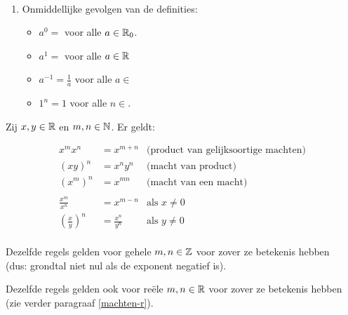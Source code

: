 \documentclass{ximera}
\begin{document}
\begin{remark} \ 
	
	\begin{enumerate}
	\item Onmiddellijke gevolgen van de definities:
			\begin{itemize}
			\item $a^0=$ voor alle $a\in\mathbb{R}_0$.
			\item $a^1=$ voor alle $a\in\mathbb{R}$
			\item $a^{-1}=\frac{1}{a}$ voor alle $a\in$\wordChoice{\choice{$\R$}\choice{$\Rplus$}\choice[correct]{$\Rnul$}}
			\item $1^n=1$ voor alle $n\in$\wordChoice{\choice{$\N$}\choice{$\R$}\choice[correct]{$\Z$}}.
		\end{itemize}
\end{enumerate} 
\end{remark}

\begin{proposition}
	Zij $x,y\in\mathbb{R}$ en $m,n\in\mathbb{N}$. Er geldt:
{
	\savebox\strutbox{$\vphantom{\dfrac11^n}$}   %
\begin{align*}
	x^{m}x^{n}  & = x^{m+n}            & \text{(product van gelijksoortige machten)} \\
	(xy)^n      & = x^ny^n             & \text{(macht van product)}\\
	\left(x^{m}\right)^{n} & = x^{mn}  & \text{(macht van een macht)} \\
	\\
	\frac{x^{m}}{x^{n}}    & = x^{m-n} & \text{als }x\neq0\\
	\left(\frac{x}{y}\right)^{n} & = \frac{x^{n}}{y^{n}} & \text{als }y\neq0\\
\end{align*}

	Dezelfde regels gelden voor gehele $m,n\in\mathbb{Z}$ voor zover ze betekenis hebben 
	\\ (dus: grondtal niet nul als de exponent negatief is).
	
	Dezelfde regels gelden ook voor reële $m,n\in\mathbb{R}$ voor zover ze betekenis hebben
	\\ (zie verder paragraaf \ref{machten-r}).
}
\end{proposition}
\end{document}
